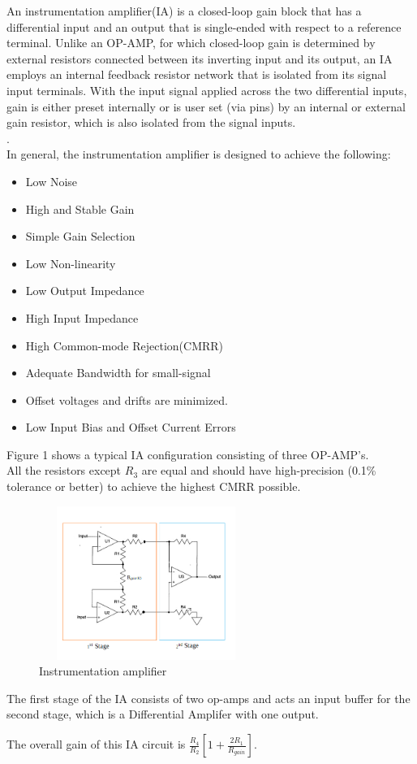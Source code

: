 \documentclass[]{article}
\begin{document}
		An instrumentation amplifier(IA) is a closed-loop gain block that has a differential input and an output that is single-ended with respect to a reference terminal. Unlike an OP-AMP, for which closed-loop gain is determined by external resistors connected between its
		inverting input and its output, an IA employs an internal feedback resistor network that is isolated from its signal input terminals. With the input signal applied across
		the two differential inputs, gain is either preset internally
		or is user set (via pins) by an internal or external gain
		resistor, which is also isolated from the signal inputs.\\
		\vspace{.1cm}\cite{kitchin2006}.\\
	   {{In general, the instrumentation amplifier is designed to achieve the following:}}\cite{sciencedirect}
		\begin{itemize}
			\item Low Noise
			\item High and Stable Gain	
			\item Simple Gain Selection	
			\item Low Non-linearity
			\item Low Output Impedance 
			\item High Input Impedance 
			\item High Common-mode Rejection(CMRR)
			\item Adequate Bandwidth for small-signal
			\item Offset voltages and drifts are minimized.
			\item Low Input Bias and Offset Current Errors
			
		\end{itemize}
	
		Figure 1 shows a typical IA configuration consisting of three OP-AMP's.\\All the resistors except $R_3$ are equal and  should have high-precision (0.1\% tolerance or better) to achieve the highest CMRR possible. \\

\begin{figure}[H]
	\centering
	\includegraphics[width=7cm, height=5cm]{IA_DIAGRAM}
	\caption[Figure 1: ]{Instrumentation amplifier}
	\label{fig:IA-CIRCUIT-DIAGRAM}
\end{figure}
	The first stage of the IA consists of two op-amps and acts an input buffer for the second stage, which is a Differential Amplifer with one output.
	\begin{center}The overall gain of this IA circuit is $\frac{R_4}{R_2}\left[1 + \frac{2R_1}{R_{gain}}\right]$.\\\end{center}
	
\end{document}
